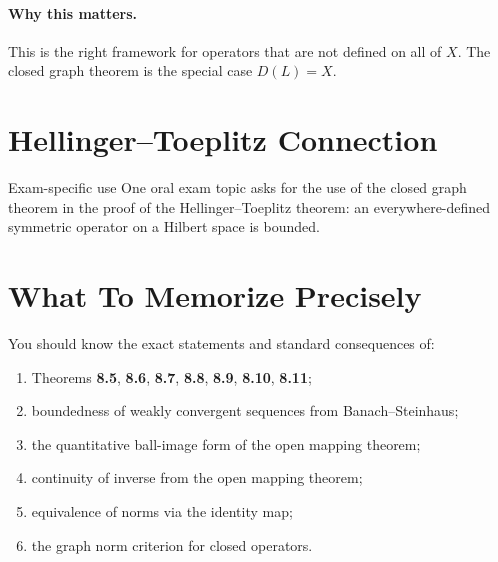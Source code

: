 \documentclass[11pt]{article}
\begin{document}
\paragraph{Why this matters.}
This is the right framework for operators that are not defined on all of $X$. The closed graph theorem is the special case $D(L)=X$.

\section{Hellinger--Toeplitz Connection}

\begin{warningbox}{Exam-specific use}
One oral exam topic asks for the use of the closed graph theorem in the proof of the Hellinger--Toeplitz theorem: an everywhere-defined symmetric operator on a Hilbert space is bounded.
\end{warningbox}

\section{What To Memorize Precisely}

\begin{focusbox}
You should know the exact statements and standard consequences of:
\begin{enumerate}
\item Theorems \textbf{8.5}, \textbf{8.6}, \textbf{8.7}, \textbf{8.8}, \textbf{8.9}, \textbf{8.10}, \textbf{8.11};
\item boundedness of weakly convergent sequences from Banach--Steinhaus;
\item the quantitative ball-image form of the open mapping theorem;
\item continuity of inverse from the open mapping theorem;
\item equivalence of norms via the identity map;
\item the graph norm criterion for closed operators.
\end{enumerate}
\end{focusbox}
\end{document}
